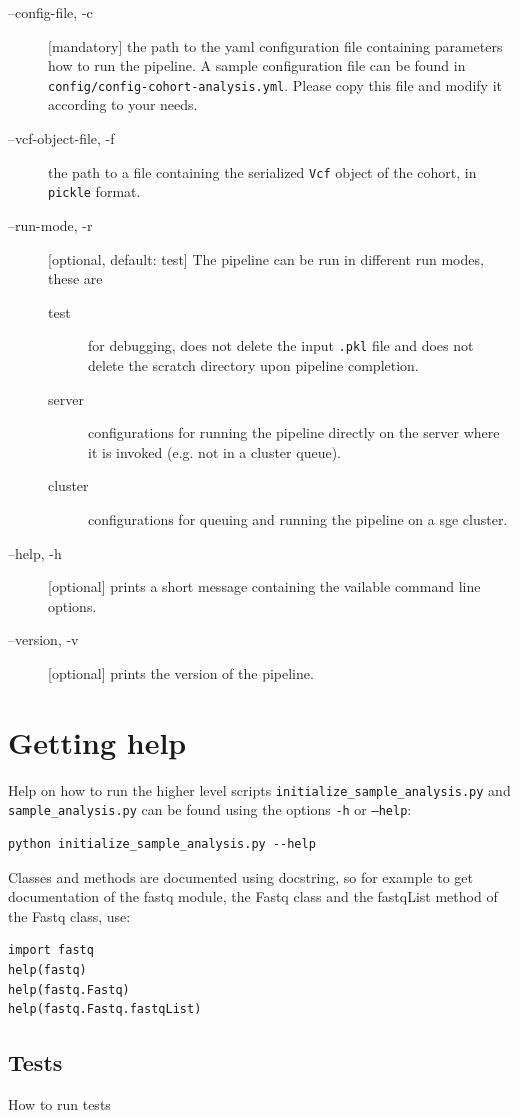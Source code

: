 \documentclass[a4paper]{article}
\begin{document}
\begin{description}
\item[--config-file, -c] [mandatory] the path to the yaml configuration
  file containing parameters how to run the pipeline. A sample
  configuration file can be found in
  \texttt{config/config-cohort-analysis.yml}. Please copy this file and
  modify it according to your needs.
\item[--vcf-object-file, -f] the path to a file containing the
  serialized \texttt{Vcf} object of the cohort, in \texttt{pickle}
  format.
\item[--run-mode, -r] [optional, default: test] The pipeline can be
  run in different run modes, these are 

  \begin{description}
  \item[test] for debugging, does not delete the input \texttt{.pkl}
    file and does not delete the scratch directory upon pipeline
    completion.
  \item[server] configurations for running the pipeline directly on
    the server where it is invoked (e.g. not in a cluster queue).
  \item[cluster] configurations for queuing and running the pipeline
    on a sge cluster.
  \end{description}
    
\item[--help, -h] [optional] prints a short message containing the
  vailable command line options.

\item[--version, -v] [optional] prints the version of the pipeline.

\end{description}




\section{Getting help}
\label{sec:getting-help}


Help on how to run the higher level
scripts \texttt{initialize\_sample\_analysis.py} and
\texttt{sample\_analysis.py} can be found using the options
\texttt{-h} or \texttt{--help}:

\begin{verbatim}
python initialize_sample_analysis.py --help
\end{verbatim}

Classes and methods are documented using docstring, so for example to
get documentation of the fastq module, the Fastq class and the
fastqList method of the Fastq class, use:

\begin{verbatim}
import fastq
help(fastq)
help(fastq.Fastq)
help(fastq.Fastq.fastqList)
\end{verbatim}


\subsection{Tests}
\label{sec:tests}

How to run tests


\printbibliography
\end{document}
